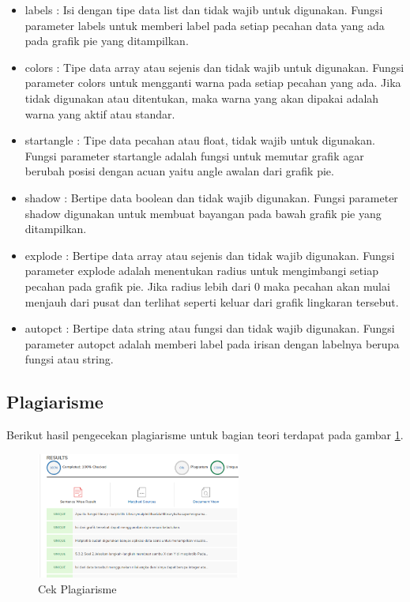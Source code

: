 \begin{itemize}
	\item labels : Isi dengan tipe data list dan tidak wajib untuk digunakan. Fungsi parameter labels untuk memberi label pada setiap pecahan data yang ada pada grafik pie yang ditampilkan.
	\item colors : Tipe data array atau sejenis dan tidak wajib untuk digunakan. Fungsi parameter colors untuk mengganti warna pada setiap pecahan yang ada. Jika tidak digunakan atau ditentukan, maka warna yang akan dipakai adalah warna yang aktif atau standar.
	\item startangle : Tipe data pecahan atau float, tidak wajib untuk digunakan. Fungsi parameter startangle adalah fungsi untuk memutar grafik agar berubah posisi dengan acuan yaitu angle awalan dari grafik pie.
	\item shadow : Bertipe data boolean dan tidak wajib digunakan. Fungsi parameter shadow digunakan untuk membuat bayangan pada bawah grafik pie yang ditampilkan. 
	\item explode : Bertipe data array atau sejenis dan tidak wajib digunakan. Fungsi parameter explode adalah menentukan radius untuk mengimbangi setiap pecahan pada grafik pie. Jika radius lebih dari 0 maka pecahan akan mulai menjauh dari pusat dan terlihat seperti keluar dari grafik lingkaran tersebut.
	\item autopct : Bertipe data string atau fungsi dan tidak wajib digunakan. Fungsi parameter autopct adalah memberi label pada irisan dengan labelnya berupa fungsi atau string. 
\end{itemize}

\subsection{Plagiarisme}
Berikut hasil pengecekan plagiarisme untuk bagian teori terdapat pada gambar \ref{Plagiarisme}.
\begin{figure} [ht]
	\centerline{\includegraphics[width=0.6\textwidth]{figures/6/1174035/Teori/Plagiarisme.png}}
	\caption{Cek Plagiarisme}
	\label{Plagiarisme}
\end{figure}


